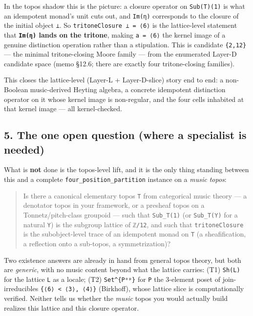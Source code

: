 \documentclass[
  11pt,
]{article}
\begin{document}
In the topos shadow this is the picture: a closure operator on
\texttt{Sub(T)(1)} is what an idempotent monad's unit cuts out, and
\texttt{Im(η)} corresponds to the closure of the initial object
\texttt{⊥}. So \texttt{tritoneClosure\ ⊥\ =\ ⟨6⟩} is the lattice-level
statement that \textbf{\texttt{Im(η)} lands on the tritone}, making
\texttt{a\ =\ ⟨6⟩} the kernel image of a genuine distinction operation
rather than a stipulation. This is candidate \texttt{\{2,12\}} --- the
minimal tritone-closing Moore family --- from the enumerated Layer-D
candidate space (memo §12.6; there are exactly four tritone-closing
families).

This closes the lattice-level (Layer-L + Layer-D-slice) story end to
end: a non-Boolean music-derived Heyting algebra, a concrete idempotent
distinction operator on it whose kernel image is non-regular, and the
four cells inhabited at that kernel image --- all kernel-checked.

\subsection{5. The one open question (where a specialist is
needed)}\label{the-one-open-question-where-a-specialist-is-needed}

What is \textbf{not} done is the topos-level lift, and it is the only
thing standing between this and a complete
\texttt{four\_position\_partition} instance on a \emph{music topos}:

\begin{quote}
Is there a canonical elementary topos \texttt{T} from categorical music
theory --- a denotator topos in your framework, or a presheaf topos on a
Tonnetz/pitch-class groupoid --- such that \texttt{Sub\_T(1)} (or
\texttt{Sub\_T(Y)} for a natural \texttt{Y}) is the subgroup lattice of
\texttt{ℤ/12}, and such that \texttt{tritoneClosure} is the
subobject-level trace of an idempotent monad on \texttt{T} (a
sheafification, a reflection onto a sub-topos, a symmetrization)?
\end{quote}

Two existence answers are already in hand from general topos theory, but
both are \emph{generic}, with no music content beyond what the lattice
carries: (T1) \texttt{Sh(L)} for the lattice \texttt{L} as a locale;
(T2) \texttt{Set\^{}\{Pᵒᵖ\}} for \texttt{P} the 3-element poset of
join-irreducibles \texttt{\{⟨6⟩\ \textless{}\ ⟨3⟩,\ ⟨4⟩\}} (Birkhoff),
whose lattice slice is computationally verified. Neither tells us
whether the \emph{music} topos you would actually build realizes this
lattice and this closure operator.
\end{document}
